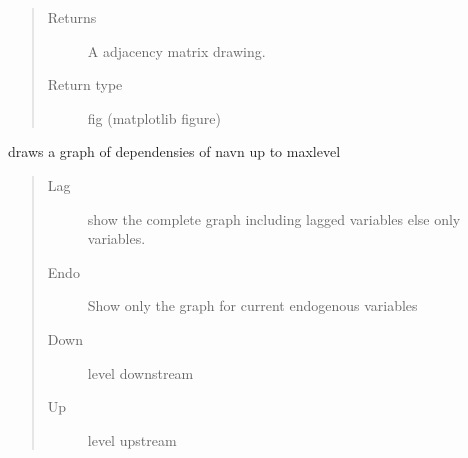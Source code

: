 \documentclass[letterpaper,10pt,english]{sphinxmanual}
\begin{document}
\begin{fulllineitems}
\begin{fulllineitems}
\begin{quote}
\begin{description}
\begin{itemize}
\end{itemize}

\item[{Returns}] \leavevmode
\sphinxAtStartPar
A adjacency matrix drawing.

\item[{Return type}] \leavevmode
\sphinxAtStartPar
fig (matplotlib figure)

\end{description}\end{quote}

\end{fulllineitems}


\begin{fulllineitems}
\label{\detokenize{index:modelclass.Graph_Draw_Mixin.draw}}
\pysigstartsignatures
{}
\pysigstopsignatures
\sphinxAtStartPar
draws a graph of dependensies of navn up to maxlevel
\begin{quote}\begin{description}
\item[{Lag}] \leavevmode
\sphinxAtStartPar
show the complete graph including lagged variables else only variables.

\item[{Endo}] \leavevmode
\sphinxAtStartPar
Show only the graph for current endogenous variables

\item[{Down}] \leavevmode
\sphinxAtStartPar
level downstream

\item[{Up}] \leavevmode
\sphinxAtStartPar
level upstream

\end{description}\end{quote}

\end{fulllineitems}



\end{fulllineitems}
\end{document}
